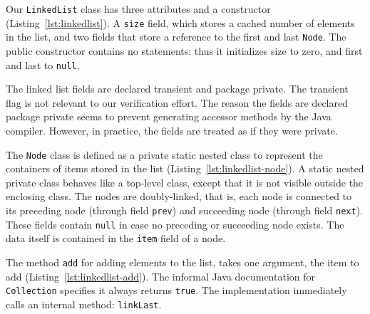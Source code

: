 \documentclass[runningheads]{llncs}
\begin{document}


Our \texttt{LinkedList} class has three attributes and a constructor (Listing~\ref{lst:linkedlist}). A \texttt{size} field, which stores a cached number of elements in the list, and two fields that store a reference to the first and last \texttt{Node}. The public constructor contains no statements: thus it initializes size to zero, and first and last to \texttt{null}.

The linked list fields are declared transient and package private. The transient flag is not relevant to our verification effort. The reason the fields are declared package private seems to prevent generating accessor methods by the Java compiler. However, in practice, the fields are treated as if they were private.



The \texttt{Node} class is defined as a private static nested class to represent the containers of items stored in the list (Listing~\ref{lst:linkedlist-node}). A static nested private class behaves like a top-level class, except that it is not visible outside the enclosing class. The nodes are doubly-linked, that is, each node is connected to its preceding node (through field \texttt{prev}) and succeeding node (through field \texttt{next}). These fields contain \texttt{null} in case no preceding or succeeding node exists. The data itself is contained in the \texttt{item} field of a node.



The method \texttt{add} for adding elements to the list, takes one argument, the item to add (Listing~\ref{lst:linkedlist-add}). The informal Java documentation for \texttt{Collection} specifies it always returns \texttt{true}. The implementation immediately calls an internal method: \texttt{linkLast}.


\end{document}

